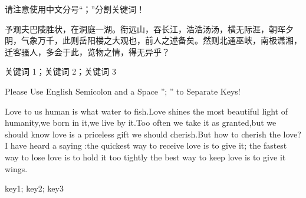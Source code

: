 
\abstractch
请注意使用中文分号“；”分割关键词！

予观夫巴陵胜状，在洞庭一湖。衔远山，吞长江，浩浩汤汤，横无际涯，朝晖夕阴，气象万千，此则岳阳楼之大观也，前人之述备矣。然则北通巫峡，南极潇湘，迁客骚人，多会于此，览物之情，得无异乎？

\keywordsch 关键词 1；关键词 2；关键词 3

\abstracten
Please Use English Semicolon and a Space ”; ” to Separate Keys!

Love to us human is what water to fish.Love shines the most beautiful light of humanity,we born in it,we live by it.Too often we take it as granted,but we should know love is a priceless gift we should cherish.But how to cherish the love?I have heard a saying :the quickest way to receive love is to give it; the fastest way to lose love is to hold it too tightly the best way to keep love is to give it wings.

\keywordsen key1; key2; key3
